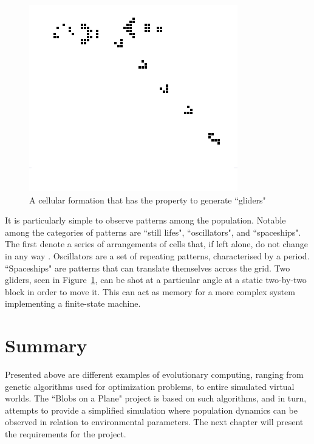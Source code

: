 \begin{figure}[!th]
	\centering
	\includegraphics[scale=0.6]{images/glidergun}
	\caption{\label{fig:glider}A cellular formation that has the property to generate ``gliders"}
\end{figure}

It is particularly simple to observe patterns among the population. Notable among the categories of patterns are ``still lifes", ``oscillators", and ``spaceships". The first denote a series of arrangements of cells that, if left alone, do not change in any way \cite{griffeath2003new}. Oscillators are a set of repeating patterns, characterised by a period. ``Spaceships" are patterns that can translate themselves across the grid. Two gliders, seen in Figure~\ref{fig:glider}, can be shot at a particular angle at a static two-by-two block in order to move it. This can act as memory for a more complex system implementing a finite-state machine.

\section{Summary}
Presented above are different examples of evolutionary computing, ranging from genetic algorithms used for optimization problems, to entire simulated virtual worlds. The ``Blobs on a Plane" project is based on such algorithms, and in turn, attempts to provide a simplified simulation where population dynamics can be observed in relation to environmental parameters.
The next chapter will present the requirements for the project.